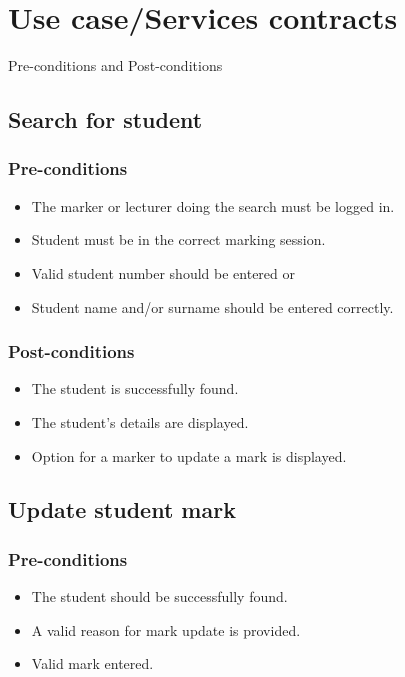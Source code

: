 \section{Use case/Services contracts}

\par{Pre-conditions and Post-conditions}\\

\subsection{Search for student}
\subsubsection{Pre-conditions}
\begin{itemize}
\item The marker or lecturer doing the search must be logged in.
\item Student must be in the correct marking session.
\item Valid student number should be entered or
\item Student name and/or surname should be entered correctly.
\end{itemize}
\subsubsection{Post-conditions}
\begin{itemize}
\item The student is successfully found.
\item The student's details are displayed.
\item Option for a marker to update a mark is displayed.
\end{itemize}

\subsection{Update student mark}
\subsubsection{Pre-conditions}
\begin{itemize}
\item The student should be successfully found.
\item A valid reason for mark update is provided.
\item Valid mark entered.
\end{itemize}
